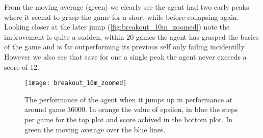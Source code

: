 From the moving average (green) we clearly see the agent had two early peaks where it seemd to grasp the game for a short while before collapsing again. Looking closer at the later jump (\autoref{fig:breakout_10m_zoomed}) note the improvement is quite a sudden, within 20 games the agent has grasped the basics of the game and is far outperforming its previous self only failing incidentilly. However we also see that save for one a single peak the agent never exceeds a score of 12.

\begin{figure}
    \texttt{[image: breakout\_10m\_zoomed]}
    \caption{The performance of the agent when it jumps up in performance at around game $36000$. In orange the value of epsilon, in blue the steps per game for the top plot and score achived in the bottom plot. In green the moving average over the blue lines.}
    \label{fig:breakout_10m_zoomed}
\end{figure}
